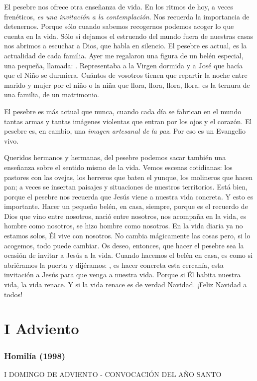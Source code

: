 El pesebre nos ofrece otra enseñanza de vida. En los ritmos de hoy, a veces frenéticos, \emph{es una invitación a la contemplación}. Nos recuerda la importancia de detenernos. Porque sólo cuando sabemos recogernos podemos acoger lo que cuenta en la vida. Sólo si dejamos el estruendo del mundo fuera de nuestras casas nos abrimos a escuchar a Dios, que habla en silencio. El pesebre es actual, es la actualidad de cada familia. Ayer me regalaron una figura de un belén especial, una pequeña, llamada: . Representaba a la Virgen dormida y a José que hacía que el Niño se durmiera. Cuántos de vosotros tienen que repartir la noche entre marido y mujer por el niño o la niña que llora, llora, llora, llora.  es la ternura de una familia, de un matrimonio.

El pesebre es más actual que nunca, cuando cada día se fabrican en el mundo tantas armas y tantas imágenes violentas que entran por los ojos y el corazón. El pesebre es, en cambio, una \emph{imagen artesanal de la paz}. Por eso es un Evangelio vivo.

Queridos hermanos y hermanas, del pesebre podemos sacar también una enseñanza sobre el sentido mismo de la vida. Vemos escenas cotidianas: los pastores con las ovejas, los herreros que baten el yunque, los molineros que hacen pan; a veces se insertan paisajes y situaciones de nuestros territorios. Está bien, porque el pesebre nos recuerda que Jesús viene a nuestra vida concreta. Y esto es importante. Hacer un pequeño belén, en casa, siempre, porque es el recuerdo de Dios que vino entre nosotros, nació entre nosotros, nos acompaña en la vida, es hombre como nosotros, se hizo hombre como nosotros. En la vida diaria ya no estamos solos, Él vive con nosotros. No cambia mágicamente las cosas pero, si lo acogemos, todo puede cambiar. Os deseo, entonces, que hacer el pesebre sea la ocasión de invitar a Jesús a la vida. Cuando hacemos el belén en casa, es como si abriéramos la puerta y dijéramos: , es hacer concreta esta cercanía, esta invitación a Jesús para que venga a nuestra vida. Porque si Él habita nuestra vida, la vida renace. Y si la vida renace es de verdad Navidad. ¡Feliz Navidad a todos!

\section{I Adviento}

\subsubsection{Homilía (1998)} I DOMINGO DE ADVIENTO - CONVOCACIÓN DEL AÑO SANTO

